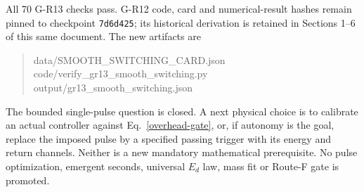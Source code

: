 \documentclass[11pt,a4paper]{article}
\begin{document}
All 70 G-R13 checks pass. G-R12 code, card and numerical-result hashes
remain pinned to checkpoint \texttt{7d6d425}; its historical derivation
is retained in Sections 1--6 of this same document. The new artifacts are
\begin{quote}\small\ttfamily
data/SMOOTH\_SWITCHING\_CARD.json\\
code/verify\_gr13\_smooth\_switching.py\\
output/gr13\_smooth\_switching.json
\end{quote}
\noindent The bounded single-pulse question is closed. A next physical
choice is to calibrate an actual controller against Eq.~\eqref{overhead-gate},
or, if autonomy is the goal, replace the imposed pulse by a specified
passing trigger with its energy and return channels. Neither is a new
mandatory mathematical prerequisite. No pulse optimization, emergent
seconds, universal $E_d$ law, mass fit or Route-F gate is promoted.
\end{document}
